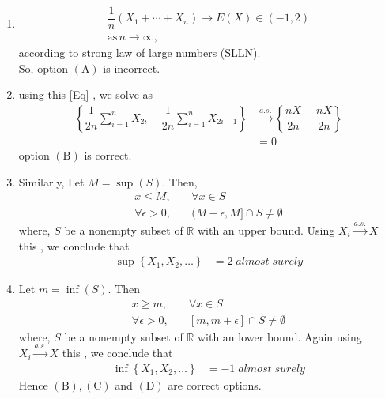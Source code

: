 \documentclass[journal,12pt,twocolumn]{IEEEtran}
\begin{document}
\begin{enumerate}[label=\alph*)]
\item\begin{align}
\dfrac{1}{n}\left(X_{1}+\cdots+X_{n}\right) \rightarrow E(X)\in(-1,2)\\
\text{as} \, n\rightarrow\infty,
\end{align}
according to strong law of large numbers (SLLN).\\
So, option $(\mathrm{A})$ is incorrect.
\item using this \ref{Eq} , we solve as
\begin{align}
\left\{\dfrac{1}{2 n} \sum_{i=1}^{n} X_{2 i}-\dfrac{1}{2 n} \sum_{i=1}^{n} X_{2 i-1}\right\}&\stackrel{a.s.}{\rightarrow}\left\{\dfrac{nX}{2 n}-\dfrac{nX}{2 n}\right\}\\
&=0
\end{align}
option $(\mathrm{B})$ is correct.
\item  Similarly, Let $M=\sup (S) .$ Then,
\begin{align}
x \leq M, &\quad \forall x \in S \\
\forall \epsilon>0,& \quad(M-\epsilon, M] \cap S \neq \emptyset
\end{align}
where, $S$ be a nonempty subset of $\mathbb{R}$ with an upper bound. Using $X_i \stackrel{a.s.}{\rightarrow} X$ this , we  conclude that
\begin{align}
\sup \left\{X_{1}, X_{2}, \ldots\right\}&=2 \;almost\; surely
\end{align}
\item Let $m=\inf (S)$. Then
\begin{align}
x \geq m, & \quad \forall x \in S \\
\forall \epsilon>0, &\quad {[m, m+\epsilon] \cap S \neq \emptyset}
\end{align}
where, $S$ be a nonempty subset of $\mathbb{R}$ with an lower bound. Again using $X_i \stackrel{a.s.}{\rightarrow} X$ this , we conclude that
\begin{align}
\inf \left\{X_{1}, X_{2}, \ldots\right\}&=-1 \;almost\; surely
\end{align}
Hence $(\mathrm{B}),(\mathrm{C})$ and $(\mathrm{D})$ are correct options.
\end{enumerate}
\end{document}
